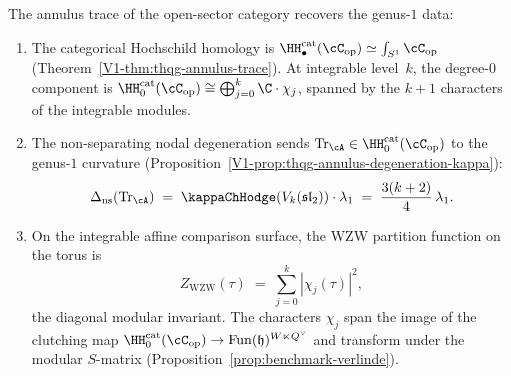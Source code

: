 \begin{proposition}
\label{prop:benchmark-annulus-partition}
The annulus trace of the open-sector category recovers the
genus-$1$ data:
\begin{enumerate}[label=\textup{(\roman*)}]
\item The categorical Hochschild homology is
 $\HH^{\mathrm{cat}}_\bullet(\cC_{\mathrm{op}}) \simeq
 \int_{S^1} \cC_{\mathrm{op}}$
 \textup{(}Theorem~\textup{\ref*{V1-thm:thqg-annulus-trace}}\textup{)}.
 At integrable level~$k$, the degree-$0$ component is
 $\HH^{\mathrm{cat}}_0(\cC_{\mathrm{op}}) \cong
 \bigoplus_{j=0}^k \C \cdot \chi_j$,
 spanned by the $k + 1$ characters of the integrable modules.

\item The non-separating nodal degeneration sends
 $\mathrm{Tr}_\cA \in \HH^{\mathrm{cat}}_0(\cC_{\mathrm{op}})$ to the
 genus-$1$ curvature
 \textup{(}Proposition~\textup{\ref*{V1-prop:thqg-annulus-degeneration-kappa}}\textup{)}:
 \begin{equation}\label{eq:benchmark-annulus-kappa}
 \Delta_{\mathrm{ns}}(\mathrm{Tr}_\cA)
 \;=\;
 \kappaChHodge(V_k(\mathfrak{sl}_2)) \cdot \lambda_1
 \;=\;
 \frac{3(k+2)}{4}\, \lambda_1.
 \end{equation}

\item On the integrable affine comparison surface, the WZW partition
 function on the torus is
 \begin{equation}\label{eq:benchmark-wzw-partition}
 Z_{\mathrm{WZW}}(\tau)
 \;=\;
 \sum_{j=0}^{k}
 |\chi_j(\tau)|^2,
 \end{equation}
 the diagonal modular invariant. The characters $\chi_j$
 span the image of the clutching map
 $\HH^{\mathrm{cat}}_0(\cC_{\mathrm{op}}) \to
 \mathrm{Fun}(\mathfrak{h})^{W \ltimes Q^\vee}$
 and transform under the modular $S$-matrix
 \textup{(}Proposition~\textup{\ref{prop:benchmark-verlinde}}\textup{)}.
\end{enumerate}
\end{proposition}

